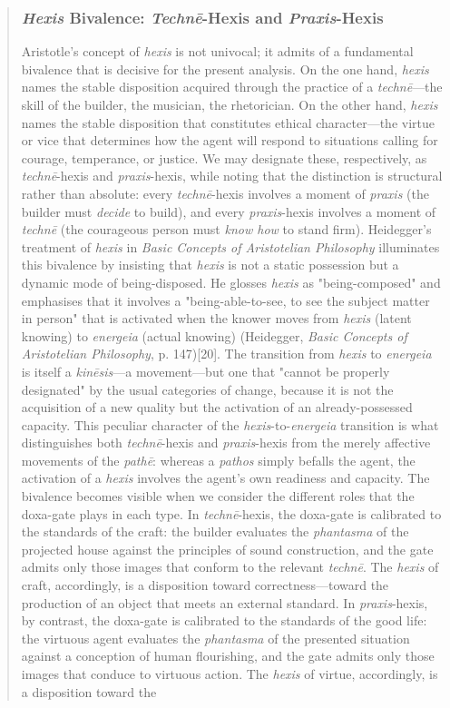 \documentclass{article}
\begin{document}
\begin{quote}
\subsubsection*{\textit{Hexis} Bivalence: \textit{Technē}-Hexis and \textit{Praxis}-Hexis} Aristotle's concept of \textit{hexis} is not univocal; it admits of a fundamental bivalence that is decisive for the present analysis. On the one hand, \textit{hexis} names the stable disposition acquired through the practice of a \textit{technē}---the skill of the builder, the musician, the rhetorician. On the other hand, \textit{hexis} names the stable disposition that constitutes ethical character---the virtue or vice that determines how the agent will respond to situations calling for courage, temperance, or justice. We may designate these, respectively, as \textit{technē}-hexis and \textit{praxis}-hexis, while noting that the distinction is structural rather than absolute: every \textit{technē}-hexis involves a moment of \textit{praxis} (the builder must \textit{decide} to build), and every \textit{praxis}-hexis involves a moment of \textit{technē} (the courageous person must \textit{know how} to stand firm). Heidegger's treatment of \textit{hexis} in \textit{Basic Concepts of Aristotelian Philosophy} illuminates this bivalence by insisting that \textit{hexis} is not a static possession but a dynamic mode of being-disposed. He glosses \textit{hexis} as "being-composed" and emphasises that it involves a "being-able-to-see, to see the subject matter in person" that is activated when the knower moves from \textit{hexis} (latent knowing) to \textit{energeia} (actual knowing) (Heidegger, \textit{Basic Concepts of Aristotelian Philosophy}, p. 147)[20]. The transition from \textit{hexis} to \textit{energeia} is itself a \textit{kinēsis}---a movement---but one that "cannot be properly designated" by the usual categories of change, because it is not the acquisition of a new quality but the activation of an already-possessed capacity. This peculiar character of the \textit{hexis}-to-\textit{energeia} transition is what distinguishes both \textit{technē}-hexis and \textit{praxis}-hexis from the merely affective movements of the \textit{pathē}: whereas a \textit{pathos} simply befalls the agent, the activation of a \textit{hexis} involves the agent's own readiness and capacity. The bivalence becomes visible when we consider the different roles that the doxa-gate plays in each type. In \textit{technē}-hexis, the doxa-gate is calibrated to the standards of the craft: the builder evaluates the \textit{phantasma} of the projected house against the principles of sound construction, and the gate admits only those images that conform to the relevant \textit{technē}. The \textit{hexis} of craft, accordingly, is a disposition toward correctness---toward the production of an object that meets an external standard. In \textit{praxis}-hexis, by contrast, the doxa-gate is calibrated to the standards of the good life: the virtuous agent evaluates the \textit{phantasma} of the presented situation against a conception of human flourishing, and the gate admits only those images that conduce to virtuous action. The \textit{hexis} of virtue, accordingly, is a disposition toward the 
\end{quote}
\end{document}
